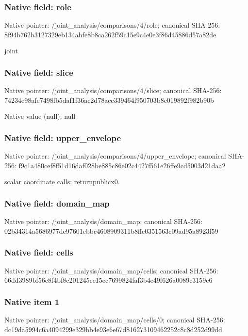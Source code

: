 \documentclass[10pt,a4paper]{article}
\begin{document}
\subsubsection{Native field: role}
Native pointer: /joint\_\allowbreak{}analysis/comparisons/4/role; canonical SHA-256: 8f94b762b3127329eb134abfe8b8ca262f59c15e9c4e0e3f86d45886d57a82de

\begingroup\raggedright\sloppy joint\par\endgroup

\subsubsection{Native field: slice}
Native pointer: /joint\_\allowbreak{}analysis/comparisons/4/slice; canonical SHA-256: 74234e98afe7498fb5daf1f36ac2d78acc339464f950703b8c019892f982b90b

Native value (null): null

\subsubsection{Native field: upper\_\allowbreak{}envelope}
Native pointer: /joint\_\allowbreak{}analysis/comparisons/4/upper\_\allowbreak{}envelope; canonical SHA-256: f9c1a480cef8f51d16daf028be885c86e02c4427f561e26ffe9cd5003d21daa2

\begingroup\raggedright{} scalar coordinate calls;\allowbreak{} returnpublicx0.\par\endgroup

\subsubsection{Native field: domain\_\allowbreak{}map}
Native pointer: /joint\_\allowbreak{}analysis/domain\_\allowbreak{}map; canonical SHA-256: 02b34314a5686977dc97601ebbc4608909311b8ffc0351563c09ad95a8923f59

\subsubsection{Native field: cells}
Native pointer: /joint\_\allowbreak{}analysis/domain\_\allowbreak{}map/cells; canonical SHA-256: 66dd3989bf56c8f4bf8c201245ce15ec7699824faf3b4e49f626a0089c3159c6

\subsubsection{Native item 1}
Native pointer: /joint\_\allowbreak{}analysis/domain\_\allowbreak{}map/cells/0; canonical SHA-256: dc19da5994c6a4094299e329bb4e93e6e67d816273109462252c8c8d252d99dd
\end{document}
